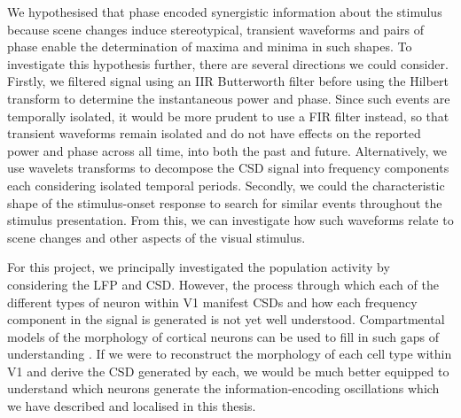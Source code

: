 We hypothesised that phase encoded synergistic information about the stimulus because scene changes induce stereotypical, transient waveforms and pairs of phase enable the determination of maxima and minima in such shapes.
To investigate this hypothesis further, there are several directions we could consider.
Firstly, we filtered signal using an \ac{IIR} Butterworth filter before using the Hilbert transform to determine the instantaneous power and phase.
Since such events are temporally isolated, it would be more prudent to use a \ac{FIR} filter instead, so that transient waveforms remain isolated and do not have effects on the reported power and phase across all time, into both the past and future.
Alternatively, we use wavelets transforms to decompose the \ac{CSD} signal into frequency components each considering isolated temporal periods.
Secondly, we could the characteristic shape of the stimulus-onset response to search for similar events throughout the stimulus presentation.
From this, we can investigate how such waveforms relate to scene changes and other aspects of the visual stimulus.

For this project, we principally investigated the population activity by considering the \ac{LFP} and \ac{CSD}.
However, the process through which each of the different types of neuron within \ac{V1} manifest \acp{CSD} and how each frequency component in the signal is generated is not yet well understood.
Compartmental models of the morphology of cortical neurons can be used to fill in such gaps of understanding \citep{Leski2013}.
If we were to reconstruct the morphology of each cell type within \ac{V1} and derive the \ac{CSD} generated by each, we would be much better equipped to understand which neurons generate the information-encoding oscillations which we have described and localised in this thesis.
